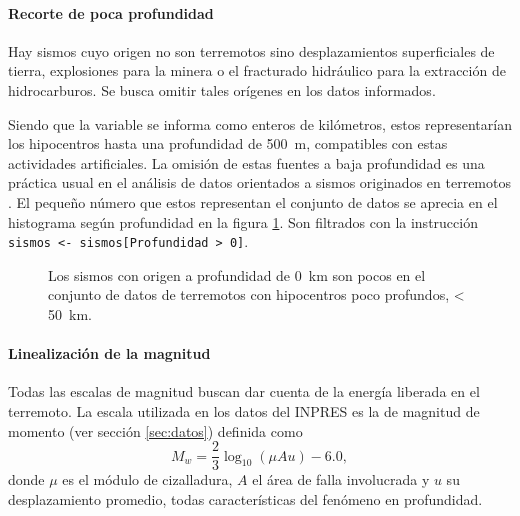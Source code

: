 \documentclass[a4paper]{report}
\begin{document}
\paragraph{Recorte de poca profundidad}

Hay sismos cuyo origen no son terremotos sino desplazamientos superficiales de tierra, explosiones para la minera o el fracturado hidráulico para la extracción de hidrocarburos.
Se busca omitir tales orígenes en los datos informados.

Siendo que la variable se informa como enteros de kilómetros, estos representarían los hipocentros hasta una profundidad de \SI{500}{\metre}, compatibles con estas actividades artificiales.
La omisión de estas fuentes a baja profundidad es una práctica usual en el análisis de datos orientados a sismos originados en terremotos \cite{hu_applying_2024}.
El pequeño número que estos representan  el conjunto de datos se aprecia en el histograma según profundidad en la figura \ref{fig:histograma_profundidad50km}.
Son filtrados con la instrucción \verb'sismos <- sismos[Profundidad > 0]'.
\begin{figure}[!ht]
	\centering
	
  \vspace{-1cm} %
	\caption{Los sismos con origen a profundidad de \SI{0}{\kilo\metre} son pocos en el conjunto de datos de terremotos con hipocentros poco profundos, < \SI{50}{\kilo\metre}.}
	\label{fig:histograma_profundidad50km}
\end{figure}



\paragraph{Linealización de la magnitud}
Todas las escalas de magnitud buscan dar cuenta de la energía liberada en el terremoto.
La escala utilizada en los datos del INPRES es la de magnitud de momento (ver sección \ref{sec:datos}) definida como \cite[ec. 4.23]{fowler_solid_1990}
\begin{equation}
	M_w = \frac{2}{3} \log_{10} \left( \mu A u \right) - 6.0,
	\label{eq:momento}
\end{equation}
donde \(\mu\) es el módulo de cizalladura, \(A\) el área de falla involucrada y \(u\) su desplazamiento promedio, todas características del fenómeno en profundidad.
\end{document}
